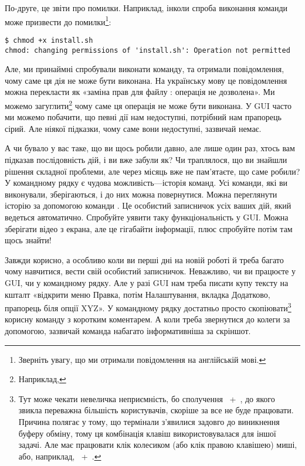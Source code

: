 По-друге, це звіти про помилки.
Наприклад, інколи спроба виконання команди  може призвести до помилки\footnote{
Зверніть увагу, що ми отримали повідомлення на англійській мові.
}:

\begin{Verbatim}[fontsize=\footnotesize]
$ chmod +x install.sh
chmod: changing permissions of 'install.sh': Operation not permitted
\end{Verbatim}

Але, ми принаймні спробували виконати команду, та отримали повідомлення, чому саме ця дія не може бути виконана.
На українську мову це повідомлення можна перекласти як «заміна прав для файлу : операція не дозволена».
Ми можемо загуглити\footnote{Наприклад, } чому саме ця операція не може бути виконана.
У GUI часто ми можемо побачити, що певні дії нам недоступні, потрібний нам прапорець сірий.
Але ніякої підказки, чому саме вони недоступні, зазвичай немає.

А чи бувало у вас таке, що ви щось робили давно, але лише один раз,
хтось вам підказав послідовність дій, і ви вже забули як?
Чи траплялося, що ви знайшли рішення складної проблеми,
але через місяць вже не пам'ятаєте, що саме робили?
У командному рядку є чудова можливість---історія команд.
Усі команди, які ви виконували, зберігаються, і до них можна повернутися.
Можна переглянути історію за допомогою команди .
Це особистий записничок усіх ваших дій, який ведеться автоматично.
Спробуйте уявити таку функціональність у GUI.
Можна зберігати відео з екрана, але це гігабайти інформації,
плюс спробуйте потім там щось знайти!

Завжди корисно, а особливо коли ви перші дні на новій роботі
й треба багато чому навчитися, вести свій особистий записничок.
Неважливо, чи ви працюєте у GUI, чи у командному рядку.
Але у разі GUI нам треба писати купу тексту на кшталт
«відкрити меню Правка, потім Налаштування, вкладка Додатково, прапорець біля опції XYZ».
У командному рядку достатньо просто скопіювати\footnote{
Тут може чекати невеличка неприємність, бо сполучення \keys{\ctrl}~+~,
до якого звикла переважна більшість користувачів, скоріше за все не буде працювати.
Причина полягає у тому, що термінали з'явилися задовго до виникнення буферу обміну,
тому ця комбінація клавіш використовувалася для іншої задачі.
Але має працювати клік колесиком (або клік правою клавішею) миші,
або, наприклад, \keys{\shift}~+~.
} корисну команду з коротким коментарем.
А коли треба звернутися до колеги за допомогою,
зазвичай команда набагато інформативніша за скріншот.


